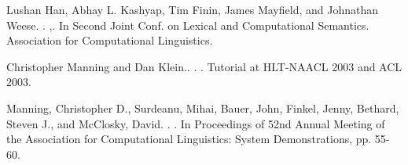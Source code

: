 \documentclass[11pt]{article}
\begin{document}
\begin{thebibliography}{}
{Lushan Han, Abhay L. Kashyap, Tim Finin, James Mayfield, and Johnathan Weese.}
.
,.
\newblock In Second Joint Conf. on Lexical and Computational Semantics. Association for Computational Linguistics.

{Christopher Manning and Dan Klein.}.
.
.
\newblock Tutorial at HLT-NAACL 2003 and ACL 2003.

{Manning, Christopher D., Surdeanu, Mihai, Bauer, John, Finkel, Jenny, Bethard, Steven J., and McClosky, David}.
.
.
\newblock In Proceedings of 52nd Annual Meeting of the Association for Computational Linguistics: System Demonstrations, pp. 55-60. 


\end{thebibliography}
\end{document}
